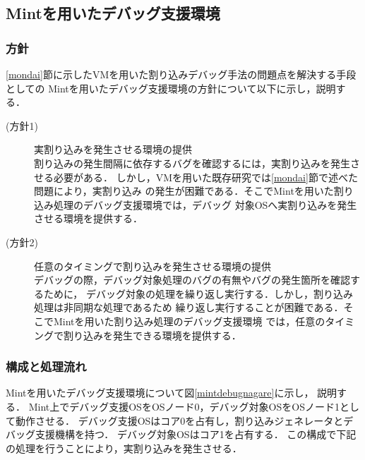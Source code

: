 \documentclass[submit,techreq,noauthor,dvipdfmx]{ipsj}
\begin{document}
\subsection{Mintを用いたデバッグ支援環境}\label{sec:debugging_support_mechanism_with_Mint}

\subsubsection{方針}\label{sec:policy}

\ref{mondai}節に示したVMを用いた割り込みデバッグ手法の問題点を解決する手段としての
Mintを用いたデバッグ支援環境の方針について以下に示し，説明する．
\begin{description}
    \item[(方針1)] 実割り込みを発生させる環境の提供\\
        割り込みの発生間隔に依存するバグを確認するには，実割り込みを発生させる必要がある．
        しかし，VMを用いた既存研究では\ref{mondai}節で述べた問題により，実割り込み
        の発生が困難である．そこでMintを用いた割り込み処理のデバッグ支援環境では，デバッグ
        対象OSへ実割り込みを発生させる環境を提供する．
    \item[(方針2)] 任意のタイミングで割り込みを発生させる環境の提供\\
        デバッグの際，デバッグ対象処理のバグの有無やバグの発生箇所を確認するために，
        デバッグ対象の処理を繰り返し実行する．しかし，割り込み処理は非同期な処理であるため
        繰り返し実行することが困難である．そこでMintを用いた割り込み処理のデバッグ支援環境
        では，任意のタイミングで割り込みを発生できる環境を提供する．
\end{description}

\subsubsection{構成と処理流れ}\label{sec:structure_and_processing_flow}


Mintを用いたデバッグ支援環境について図\ref{mintdebugnagare}に示し，
説明する．
Mint上でデバッグ支援OSをOSノード0，デバッグ対象OSをOSノード1として動作させる．
デバッグ支援OSはコア0を占有し，割り込みジェネレータとデバッグ支援機構を持つ．
デバッグ対象OSはコア1を占有する．
この構成で下記の処理を行うことにより，実割り込みを発生させる．
\end{document}
